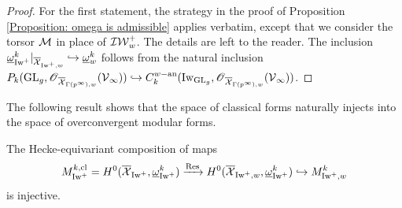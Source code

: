 \begin{proof}
For the first statement, the strategy in the proof of Proposition \ref{Proposition: omega is admissible} applies verbatim, except that we consider the torsor $\operatorname{\mathcal{M}}$ in place of $\operatorname{\mathcal{IW}}^+_w$. The details are left to the reader. The inclusion $\underline{\omega}_{\operatorname{Iw}^+}^k|_{\overline{\operatorname{\mathcal{X}}}_{\operatorname{Iw}^+, w}} \hookrightarrow \underline{\omega}_w^{k}$ follows from the natural inclusion $P_k(\operatorname{GL}_g, \operatorname{\mathscr{O}}_{\overline{\operatorname{\mathcal{X}}}_{\Gamma(p^{\infty}), w}}(\operatorname{\mathcal{V}}_{\infty}))\hookrightarrow C^{w-\operatorname{an}}_k(\operatorname{Iw}_{\operatorname{GL}_g}, \operatorname{\mathscr{O}}_{\overline{\operatorname{\mathcal{X}}}_{\Gamma(p^{\infty}), w}}(\operatorname{\mathcal{V}}_{\infty}))$.
\end{proof}

The following result shows that the space of classical forms naturally injects into the space of overconvergent modular forms.

\begin{Lemma}\label{Lemma: injection of classical forms}
The Hecke-equivariant composition of maps
$$M^{k, \mathrm{cl}}_{\operatorname{Iw}^+}=H^0(\overline{\operatorname{\mathcal{X}}}_{\operatorname{Iw}^+}, \underline{\omega}_{\operatorname{Iw}^+}^k)\xrightarrow[]{\operatorname{Res}} H^0(\overline{\operatorname{\mathcal{X}}}_{\operatorname{Iw}^+, w}, \underline{\omega}_{\operatorname{Iw}^+}^k) \hookrightarrow M_{\operatorname{Iw}^+, w}^{k}
$$
is injective. 
\end{Lemma}

